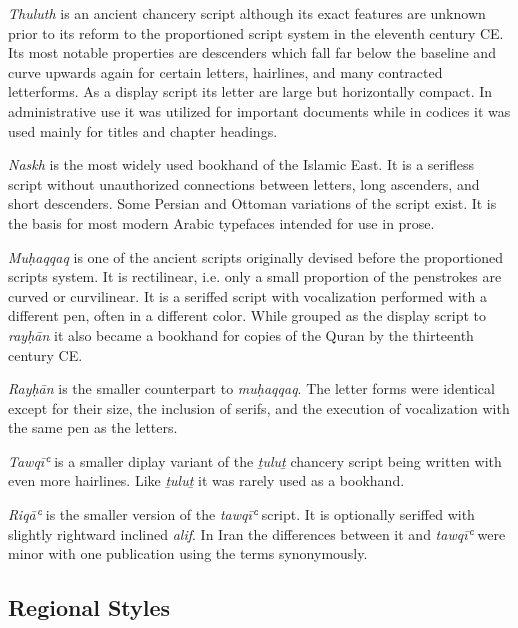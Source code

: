 \emph{Thuluth} is an ancient chancery script although its exact features are
unknown prior to its reform to the proportioned script system in the eleventh
century CE. Its most notable properties are descenders which fall far below the
baseline and curve upwards again for certain letters, hairlines, and many
contracted letterforms. As a display script its letter are large but
horizontally compact. In administrative use it was utilized for important
documents while in codices it was used mainly for titles and chapter
headings\cite[pg. 275]{gacek2009arabic}.

\emph{Naskh} is the most widely used bookhand of the Islamic East. It is a
serifless script without unauthorized connections between letters, long
ascenders, and short descenders. Some Persian and Ottoman variations of the
script exist. It is the basis for most modern Arabic typefaces intended for use
in prose\cite[pg. 162-163]{gacek2009arabic}.

\emph{Muḥaqqaq} is one of the ancient scripts originally devised before the
proportioned scripts system. It is rectilinear, i.e. only a small proportion of
the penstrokes are curved or curvilinear. It is a seriffed script with
vocalization performed with a different pen, often in a different color. While
grouped as the display script to \emph{rayḥān} it also became a bookhand for
copies of the Quran by the thirteenth century CE\cite[pg. 160-161]{gacek2009arabic}.

\emph{Rayḥān} is the smaller counterpart to \emph{muḥaqqaq}. The letter forms
were identical except for their size, the inclusion of serifs, and the
execution of vocalization with the same pen as the letters\cite[pg.
308]{EncyclopediaofArabicLanguageandLinguisticsVolume3}.

\emph{Tawqīʿ} is a smaller diplay variant of the \emph{ṯuluṯ} chancery script
being written with even more hairlines. Like \emph{ṯuluṯ} it was rarely used
as a bookhand\cite[pg. 264-264]{gacek2009arabic}.

\emph{Riqāʿ} is the smaller version of the \emph{tawqīʿ} script. It is optionally
seriffed with slightly rightward inclined \emph{alif}. In Iran the differences
between it and \emph{tawqīʿ} were minor with one publication using the terms
synonymously\cite[pg. 224]{gacek2009arabic}.

\subsection{Regional Styles}


